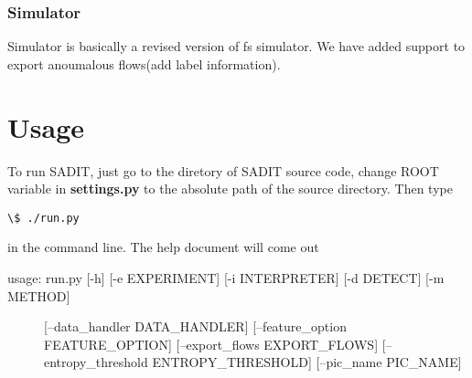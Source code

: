 \documentclass[letterpaper,10pt,english]{sphinxmanual}
\begin{document}
\subsection{Simulator}
\label{index:simulator}
Simulator is basically a revised version of fs simulator. We have added
support to export anoumalous flows(add label information).


\chapter{Usage}
\label{index:usage}
To run SADIT, just go to the diretory of SADIT source code, change ROOT variable in
\textbf{settings.py} to the absolute path of the source directory. Then type

\begin{Verbatim}[commandchars=\\\{\}]
\$ ./run.py
\end{Verbatim}

in the command line. The help document will come out
\begin{description}
\item[{usage: run.py {[}-h{]} {[}-e EXPERIMENT{]} {[}-i INTERPRETER{]} {[}-d DETECT{]} {[}-m METHOD{]}}] \leavevmode
{[}--data\_handler DATA\_HANDLER{]} {[}--feature\_option FEATURE\_OPTION{]}
{[}--export\_flows EXPORT\_FLOWS{]}
{[}--entropy\_threshold ENTROPY\_THRESHOLD{]} {[}--pic\_name PIC\_NAME{]}

\end{description}
\end{document}
